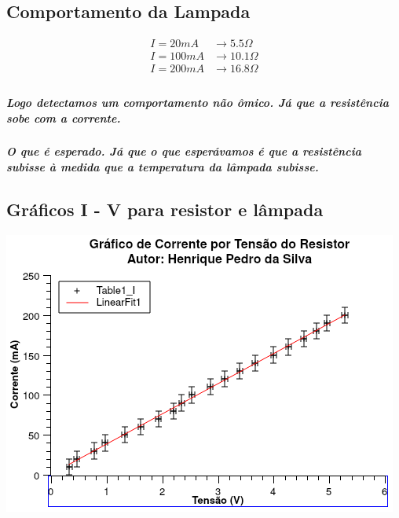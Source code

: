 \documentclass[12pt,twoside, a4paper, twocolumn]{article}
\begin{document}
\subsection{Comportamento da Lampada}

\begin{equation*}
    \begin{aligned}
        I = 20mA  & \rightarrow 5.5 \varOmega  \\
        I = 100mA & \rightarrow 10.1\varOmega  \\
        I = 200mA & \rightarrow 16.8 \varOmega \\
    \end{aligned}
\end{equation*}

\subparagraph*{Logo detectamos um comportamento não ômico. Já que a resistência sobe com a corrente.}

\subparagraph*{O que é esperado. Já que o que esperávamos é que a resistência subisse à medida que a temperatura da lâmpada subisse.}

\subsection{Gráficos I - V para resistor e lâmpada}

\begin{adjustbox}{scale=0.70}
    \includegraphics{Graph2.png}
\end{adjustbox}
\end{document}
